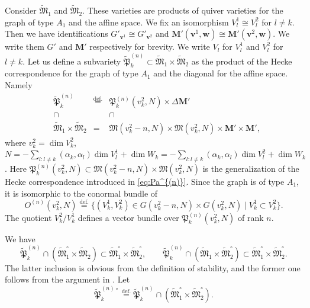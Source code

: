 \documentclass[12pt]{amsart}
\def\frak{\mathfrak}
\theoremstyle{definition}
\theoremstyle{remark}
\numberwithin{equation}{subsection}
\newcommand{\defeq}{\overset{\operatorname{\scriptstyle def.}}{=}}
\newcommand{\bM}{{\mathbf M}} %
\newcommand{\M}{{\frak M}} %
\newcommand{\bv}{{\mathbf v}} %
\newcommand{\bw}{{\mathbf w}} %
\newcommand{\Pa}{{\frak P}} %
\newcommand{\Mp}{\widetilde\M}
\begin{document}
Consider $\Mp_1$ and $\Mp_2$. These varieties are products of quiver
varieties for the graph of type $A_1$ and the affine space. We fix an
isomorphism $V^1_l \cong V^2_l$ for $l\neq k$. Then we have
identifications $G'_{\bv^1}\cong G'_{\bv^2}$ and
$\bM'(\bv^1,\bw)\cong \bM'(\bv^2,\bw)$. We write them
$G'$ and $\bM'$ respectively for brevity.
%
We write $V_l$ for $V^1_l$ and $V^2_l$ for $l\neq k$.
%
Let us define a subvariety $\widetilde\Pa_k^{(n)}\subset
\Mp_1\times\Mp_2$ as the product of the Hecke
correspondence for the graph of type $A_1$ and the diagonal for the
affine space. Namely
\begin{equation*}
\begin{matrix}
   & \widetilde\Pa_{k}^{(n)} & \defeq &
   \Pa_{k}^{(n)}(v^2_k,N)\times\Delta\bM' \\
   & \cap                       &        &  \cap                    \\
   & \Mp_1\times\Mp_2 & = &
   \M(v^2_k-n,N)\times\M(v^2_k,N)\times
   \bM'\times\bM',
\end{matrix}
\end{equation*}
where $v_k^2 = \dim V_k^2$,
$N = - \sum_{l:l\neq k} (\alpha_k,\alpha_l)\dim V^1_l+\dim W_k
= - \sum_{l:l\neq k} (\alpha_k,\alpha_l)\dim V^2_l+\dim W_k$.
%
Here $\Pa_{k}^{(n)}(v^2_k,N)\subset\M(v^2_k-n,N)\times\M(v^2_k,N)$
is the generalization of the Hecke correspondence introduced in
\eqref{eq:Pa^{(n)}}. Since the graph is of type $A_1$,
it is isomorphic to the conormal bundle of
\begin{equation*}
   O^{(n)}(v_k^2,N) \defeq
   \{ (V^1_k, V^2_k) \in G(v^2_k-n, N)\times G(v^2_k, N) \mid
   V^1_k \subset V^2_k \}.
\end{equation*}
The quotient $V^2_k/V^1_k$ defines a vector bundle over
$\Pa_{k}^{(n)}(v^2_k,N)$ of rank $n$.

We have
\begin{equation}
\label{eq:stab}
  \widetilde\Pa_{k}^{(n)}\cap
  \left(\Mp^\circ_1\times\Mp_2\right)
  \subset \Mp^\circ_1\times\Mp^\circ_2, \qquad
%
  \widetilde\Pa_{k}^{(n)}\cap
  \left(\Mp_1\times\Mp^\circ_2\right)
  \subset \Mp^\circ_1\times\Mp^\circ_2.
\end{equation}
The latter inclusion is obvious from the definition of stability, and
the former one follows from the argument in \cite[Proof of 4.5]{Na-alg}.
Let
\begin{equation*}
  \widetilde\Pa_{k}^{(n)\circ} \defeq
  \widetilde\Pa_{k}^{(n)}\cap
  \left(\Mp^\circ_1\times\Mp^\circ_2\right).
\end{equation*}
\end{document}
